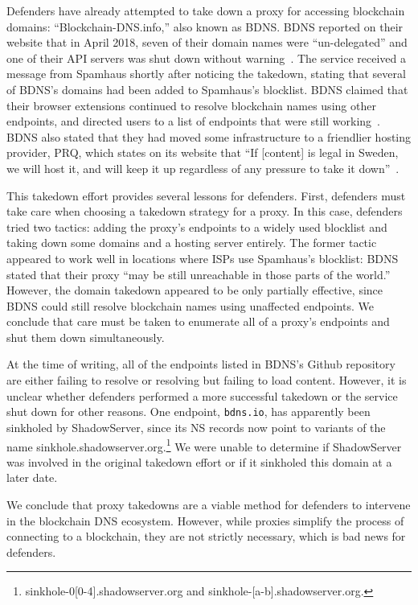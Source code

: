 Defenders have already attempted to take down a proxy for 
accessing blockchain domains: ``Blockchain-DNS.info,'' also 
known as BDNS. BDNS reported on their website that in April 
2018, seven of their domain names were ``un-delegated'' and 
one of their API servers was shut down without 
warning~\cite{blockchain-dns-info-wayback}. The service 
received a message from Spamhaus shortly after noticing the 
takedown, stating that several of 
BDNS's domains had been added to Spamhaus's blocklist. BDNS 
claimed that their browser extensions continued to resolve 
blockchain names using other endpoints, and directed users to 
a list of endpoints that were still 
working~\cite{github_bdns_wayback}. BDNS also stated that 
they had moved some infrastructure to a friendlier hosting 
provider, PRQ, which states on its website that ``If 
[content] is legal in Sweden, we will host it, and will keep 
it up regardless of any pressure to take it 
down''~\cite{prq}. 

This takedown effort provides several lessons for defenders. 
First, defenders must take care when choosing a takedown 
strategy for a proxy. In this case, defenders tried two 
tactics: 
adding the proxy's endpoints to a widely used blocklist and 
taking down some domains and a hosting server entirely. 
The former tactic appeared to work well in locations where 
ISPs use Spamhaus's blocklist: BDNS stated that their 
proxy ``may be still unreachable in those parts of the 
world.'' However, the domain takedown appeared to be only 
partially effective, since BDNS could still resolve 
blockchain names using unaffected endpoints. We conclude that 
care must be taken to enumerate all of a proxy's endpoints 
and shut them down simultaneously.  

At the time of writing, all of the endpoints listed in BDNS's 
Github repository~\cite{github_bdns_wayback} are either 
failing to resolve or resolving but failing to 
load content. However, it is unclear whether defenders 
performed a more successful takedown or the service shut down 
for other reasons. One endpoint, \texttt{bdns.io}, has 
apparently been sinkholed by ShadowServer, since its NS 
records now point to variants of the name 
sinkhole.shadowserver.org.\footnote{sinkhole-0[0-4].shadowserver.org
and sinkhole-[a-b].shadowserver.org.} We were unable to 
determine if ShadowServer was involved in the original 
takedown effort or if it sinkholed this domain at a later 
date.

We conclude that proxy takedowns are a viable method for 
defenders to intervene in the blockchain DNS ecosystem. 
However, while proxies simplify the process of 
connecting to a blockchain, they are not strictly necessary, 
which is bad news for defenders.

